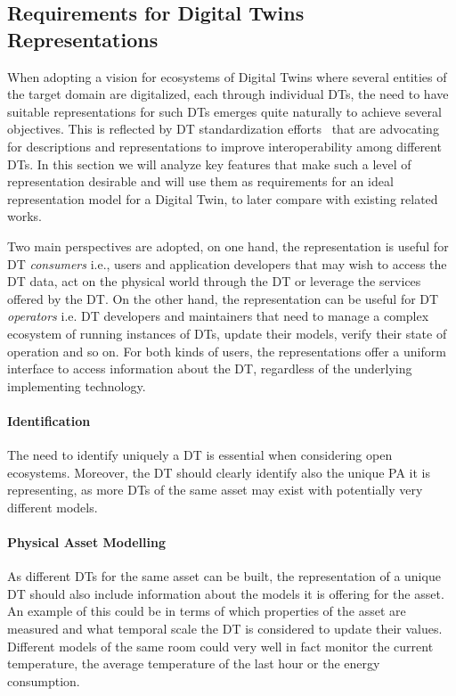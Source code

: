 \subsection{Requirements for Digital Twins Representations}

When adopting a vision for ecosystems of Digital Twins where several entities of the target domain are digitalized, each through individual DTs, the need to have suitable representations for such DTs emerges quite naturally to achieve several objectives.
This is reflected by DT standardization efforts~\cite{etsi_dt_comm_requirements} that are advocating for descriptions and representations to improve interoperability among different DTs.
%
In this section we will analyze key features that make such a level of representation desirable and will use them as requirements for an ideal representation model for a Digital Twin, to later compare with existing related works.

Two main perspectives are adopted, on one hand, the representation is useful for DT \emph{consumers} i.e., users and application developers that may wish to access the DT data, act on the physical world through the DT or leverage the services offered by the DT. 
On the other hand, the representation can be useful for DT \emph{operators} i.e. DT developers and maintainers that need to manage a complex ecosystem of running instances of DTs, update their models, verify their state of operation and so on.
For both kinds of users, the representations offer a uniform interface to access information about the DT, regardless of the underlying implementing technology.

\paragraph{Identification}
The need to identify uniquely a DT is essential when considering open ecosystems. Moreover, the DT should clearly identify also the unique PA it is representing, as more DTs of the same asset may exist with potentially very different models.

\paragraph{Physical Asset Modelling}
As different DTs for the same asset can be built, the representation of a unique DT should also include information about the models it is offering for the asset. An example of this could be in terms of which properties of the asset are measured and what temporal scale the DT is considered to update their values.
Different models of the same room could very well in fact monitor the current temperature, the average temperature of the last hour or the energy consumption. 

